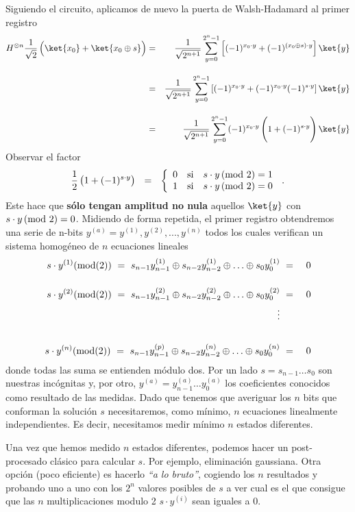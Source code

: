 \documentclass[a4paper,11pt]{book} %
\numberwithin{equation}{chapter}
\begin{document}
\begin{itemize}
	Siguiendo el circuito, aplicamos de nuevo la puerta de Walsh-Hadamard al primer registro 
	\begin{eqnarray}
	H^{\otimes n} \frac{1}{\sqrt{2}} \left( \rule{0mm}{4mm} \ket{x_0} + \ket{x_0 \oplus s} \right) &=& \frac{1}{\sqrt{2^{n+1}}} \sum_{y=0}^{2^n-1} \left[ (-1)^{x_0\cdot y} + (-1)^{(x_0\oplus s) \cdot y}\right]  \ket{y} \nonumber\\ 	\rule{0mm}{10mm}
	&=& \frac{1}{\sqrt{2^{n+1}}} \sum_{y=0}^{2^n-1} \left[ (-1)^{x_0\cdot y} + (-1)^{x_0 \cdot y}(-1)^{ s \cdot y}\right]  \ket{y} \nonumber\\ \rule{0mm}{10mm}
	&=&  \frac{1}{\sqrt{2^{n+1}}} \sum_{y=0}^{2^n-1}(-1)^{x_0\cdot y}  \left( \rule{0mm}{6mm} 1+ (-1)^{s \cdot y}\right) \ket{y}
	\end{eqnarray}
	Observar  el factor 
	$$
	\frac{1}{2}\left( \rule{0mm}{3mm} 1+ (-1)^{s \cdot y}\right)~~ = ~~ 
	\left\{\begin{array}{ccc} 0 &\hbox{si}&  s \cdot y\, (\hbox{mod 2}) = 1 \\ 
	1 &\hbox{si} & s\cdot y\, (\hbox{mod 2}) = 0\end{array}
	\right.  \,.
	$$ 
	Este hace que \textbf{sólo tengan amplitud no nula} aquellos  $\ket{y}$ con $s\cdot y\,  (\hbox{mod 2})= 0$. Midiendo de forma repetida, el primer registro obtendremos una serie de n-bits $ y^{(a)} = y^{(1)},y^{(2)},...,y^{(n)}$ todos los cuales  verifican un sistema homogéneo de $n$ ecuaciones lineales 
	\begin{eqnarray}
	s\cdot y^{(1)} (\hbox{mod(2)})~=~ s_{n-1}y^{(1)}_{n-1} \oplus s_{n-2}y^{(1)}_{n-2} \oplus \ldots \oplus s_0 y^{(1)}_0  &~=~& 0 \nonumber\\ \rule{0mm}{8mm}
	s\cdot y^{(2)} (\hbox{mod(2)}) ~=~ s_{n-1}y^{(2)}_{n-1} \oplus s_{n-2}y^{(2)}_{n-2} \oplus \ldots \oplus s_0 y^{(2)}_0 &~=~& 0 \nonumber\\
	\vdots & & \nonumber\\ \rule{0mm}{10mm}
	s\cdot y^{(n)} (\hbox{mod(2)}) ~=~ s_{n-1}y^{(p)}_{n-1} \oplus s_{n-2}y^{(n)}_{n-2} \oplus \ldots \oplus s_0 y^{(n)}_0 &~=~& 0 \nonumber\\
	\end{eqnarray}
	donde todas las suma se entienden módulo dos. Por un lado $s=s_{n-1}\ldots s_0$ son nuestras incógnitas y, por otro, $y^{(a)} = y^{(a)}_{n-1}\ldots y^{(a)}_0$ los coeficientes conocidos como resultado de las medidas. Dado que tenemos que averiguar los $n$ bits que conforman la solución $s$ necesitaremos, como mínimo, $n$ ecuaciones linealmente independientes. Es decir, necesitamos medir mínimo $n$ estados diferentes.
	
	Una vez que hemos medido $n$ estados diferentes, podemos hacer un post-procesado clásico para calcular $s$. Por ejemplo, eliminación gaussiana. Otra opción (poco eficiente) es hacerlo \textit{``a lo bruto''}, cogiendo los $n$ resultados y probando uno a uno con los $2^n$ valores posibles de $s$ a ver cual es el que consigue que las $n$ multiplicaciones modulo 2 $s \cdot y^{(i)}$ sean iguales a 0. 

\end{itemize}
\end{document}
